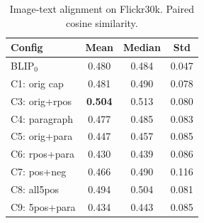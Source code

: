\begin{table}[t]
\centering
\caption{Image-text alignment on Flickr30k. Paired cosine similarity.}
\label{tab:align_flickr30k}
\small
\begin{tabular}{lccc}
\toprule
\textbf{Config} & \textbf{Mean} & \textbf{Median} & \textbf{Std} \\
\midrule
BLIP$_0$ & 0.480 & 0.484 & 0.047 \\
\midrule
C1: orig cap & 0.481 & 0.490 & 0.078 \\
C3: orig+rpos & \textbf{0.504} & 0.513 & 0.080 \\
C4: paragraph & 0.477 & 0.485 & 0.083 \\
C5: orig+para & 0.447 & 0.457 & 0.085 \\
C6: rpos+para & 0.430 & 0.439 & 0.086 \\
C7: pos+neg & 0.466 & 0.490 & 0.116 \\
C8: all5pos & 0.494 & 0.504 & 0.081 \\
C9: 5pos+para & 0.434 & 0.443 & 0.085 \\
\bottomrule
\end{tabular}
\end{table}
